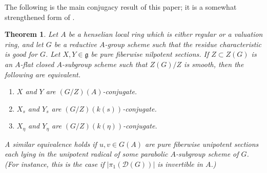 \documentclass[11pt,reqno]{amsart}
\newtheorem{theorem}{Theorem}[section]
\theoremstyle{definition}
\newcommand{\sD}{{\mathscr D}}
\newcommand{\fg}{\mathfrak{g}}
\begin{document}
The following is the main conjugacy result of this paper; it is a somewhat strengthened form of \cite[Thm.\ 1.6.1(c)]{McNinch-local-fields}.

\begin{theorem}\label{theorem:grothendieck-serre}
Let $A$ be a henselian local ring which is either regular or a valuation ring, and let $G$ be a reductive $A$-group scheme such that the residue characteristic is good for $G$. Let $X, Y \in \fg$ be pure fiberwise nilpotent sections. If $Z \subset Z(G)$ is an $A$-flat closed $A$-subgroup scheme such that $Z(G)/Z$ is smooth, then the following are equivalent.
\begin{enumerate}
    \item\label{item:conjugacy-integral} $X$ and $Y$ are $(G/Z)(A)$-conjugate.
    \item\label{item:conjugacy-special} $X_s$ and $Y_s$ are $(G/Z)(k(s))$-conjugate.
    \item\label{item:conjugacy-generic} $X_\eta$ and $Y_\eta$ are $(G/Z)(k(\eta))$-conjugate.
\end{enumerate}
A similar equivalence holds if $u, v \in G(A)$ are pure fiberwise unipotent sections each lying in the unipotent radical of some parabolic $A$-subgroup scheme of $G$. (For instance, this is the case if $|\pi_1(\sD(G))|$ is invertible in $A$.)
\end{theorem}
\end{document}
